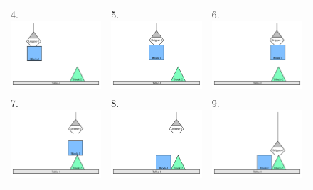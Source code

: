 \begin{figure}
\begin{center}
\begin{tabular}{p{4cm}p{4cm}p{4cm}}
4. \includegraphics[width=4cm]{gfx/blocks_world_example-4}  & 5. \includegraphics[width=4cm]{gfx/blocks_world_example-5}  & 6. \includegraphics[width=4cm]{gfx/blocks_world_example-6} \\
7. \includegraphics[width=4cm]{gfx/blocks_world_example-7}  & 8. \includegraphics[width=4cm]{gfx/blocks_world_example-8}  & 9. \includegraphics[width=4cm]{gfx/blocks_world_example-9} \\

\end{tabular}
\end{center}
\end{figure}
